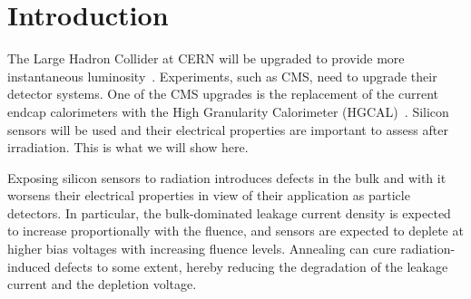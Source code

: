 \section{Introduction}
\label{sec:introduction}

The Large Hadron Collider at CERN will be upgraded to provide more instantaneous luminosity~\cite{hllhc-tdr:2017}.
Experiments, such as CMS, need to upgrade their detector systems. 
One of the CMS upgrades is the replacement of the current endcap calorimeters with the High Granularity Calorimeter (HGCAL)~\cite{hgcal-tdr:2018}.
Silicon sensors will be used and their electrical properties are important to assess after irradiation.
This is what we will show here.


Exposing silicon sensors to radiation introduces defects in the bulk and with it worsens their electrical properties in view of their application as particle detectors.
In particular, the bulk-dominated leakage current density is expected to increase proportionally with the fluence, and sensors are expected to deplete at higher bias voltages with increasing fluence levels.
Annealing can cure radiation-induced defects to some extent, hereby reducing the degradation of the leakage current and the depletion voltage.